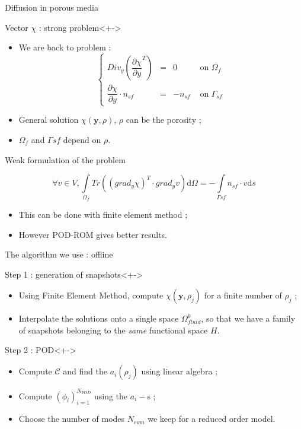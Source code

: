 \begin{frame}{Diffusion in porous media}
%
\begin{block}{Vector $\chi$ : strong problem}<+->
\begin{itemize}
\item<+-> We are back to problem :
\[%
\left\{%
\begin{array}{lccr}
Div_y \left( \dfrac{\partial{\chi}}{\partial{y}}^T\right) &=& 0&\text{ on }\Omega_f \\
\dfrac{\partial{\chi}}{\partial{y}} \cdot n_{sf}&=&-n_{sf}&\text{ on }\Gamma_{sf}
\end{array}
\right.
\]
\item<+-> General solution $\chi(\mathbf{y},\rho)$, $\rho$ can be the porosity ;
\item<+-> $\Omega_f$ and $\Gamma{sf}$ depend on $\rho$.
\end{itemize}
\end{block}
%
\end{frame}

\begin{frame}{Weak formulation of the problem}
%
\begin{block}{}
\[%
\forall v \in V , %
\int\limits_{\Omega_f}Tr\left(\left(grad_y\chi\right)^T\cdot grad_y v\right)\text{d}\Omega=%
-\int\limits_{\Gamma{sf}}n_{sf}\cdot v\text{d}s%
\]
\end{block}

\pause
\begin{itemize}
\item<+-> This can be done with finite element method ;
\item<+-> However POD-ROM gives better results.
\end{itemize}
%
\end{frame}

\begin{frame}{The algorithm we use : offline}
%
\begin{block}{Step 1 : generation of snapshots}<+->
\begin{itemize}
\item<+-> Using Finite Element Method, compute $\chi(\mathbf{y},\rho_j)$ for a finite number of $\rho_j$ ;
\item<+-> Interpolate the solutions onto a single space $\Omega_{fluid}^0$, %
so that we have a family of snapshots belonging to the \emph{same} functional space $H$.
\end{itemize}
\end{block}
%
\begin{block}{Step 2 : POD}<+->
\begin{itemize}
\item<+-> Compute $\mathcal{C}$ and find the $a_i(\rho_j)$ using linear algebra ;
\item<+-> Compute $(\phi_i)_{i=1}^{N_{POD}}$ using the $a_i-$s ;
\item<+-> Choose the number of modes $N_{rom}$ we keep for a reduced order model.
\end{itemize}
\end{block}
%
\end{frame}

